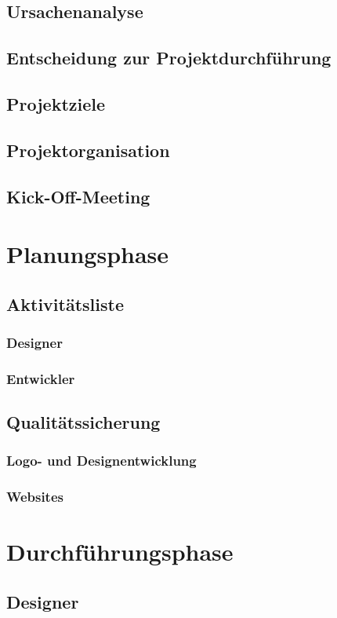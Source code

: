\documentclass[12pt,a4paper]{article}
\begin{document}
\subsection{Ursachenanalyse}
\subsection{Entscheidung zur Projektdurchführung}
\subsection{Projektziele}
\subsection{Projektorganisation}
\subsection{Kick-Off-Meeting}
\newpage
\section{Planungsphase}
\subsection{Aktivitätsliste}
\subsubsection{Designer}
\subsubsection{Entwickler}
\subsection{Qualitätssicherung}
\subsubsection{Logo- und Designentwicklung}
\subsubsection{Websites}
\newpage
\section{Durchführungsphase}
\subsection{Designer}
\end{document}
